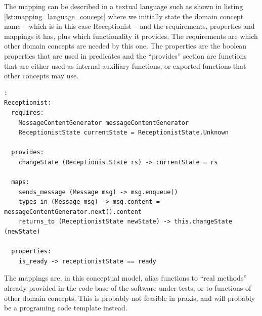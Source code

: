 \documentclass[10pt,a4paper]{article}
\begin{document}
The mapping can be described in a textual language such as shown in listing \ref{lst:mapping_language_concept} where we initially state the domain concept name -- which is in this case Receptionist -- and the requirements, properties and mappings it has, plus which functionality it provides. The requirements are which other domain concepts are needed by this one. The properties are the boolean properties that are used in predicates and the ``provides'' section are functions that are either used as internal auxiliary functions, or exported functions that other concepts may use.

\begin{lstlisting}[caption=example language for mapping concepts,label={lst:mapping_language_concept}]:
Receptionist:
  requires:
    MessageContentGenerator messageContentGenerator
    ReceptionistState currentState = ReceptionistState.Unknown
  
  provides:
    changeState (ReceptionistState rs) -> currentState = rs
  
  maps:
    sends_message (Message msg) -> msg.enqueue()
    types_in (Message msg) -> msg.content = messageContentGenerator.next().content
    returns_to (ReceptionistState newState) -> this.changeState (newState)

  properties:
    is_ready -> receptionistState == ready
\end{lstlisting}
The mappings are, in this conceptual model, alias functions to ``real methods'' already provided in the code base of the software under tests, or to functions of other domain concepts. This is probably not feasible in praxis, and will probably be a programing code template instead.
\end{document}
